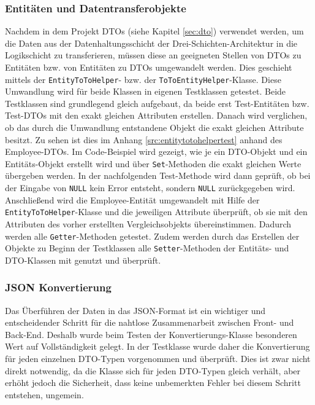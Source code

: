 \subsubsection{Entitäten und Datentransferobjekte}

Nachdem in dem Projekt \acsp{DTO} (siehe Kapitel \vref{sec:dto}) verwendet werden, um die Daten aus der Datenhaltungsschicht der Drei-Schichten-Architektur in die Logikschicht zu transferieren, müssen diese an geeigneten Stellen von \acsp{DTO} zu Entitäten bzw. von Entitäten zu \acsp{DTO}  umgewandelt werden.
Dies geschieht mittels der \texttt{EntityToToHelper}- bzw. der \texttt{ToToEntityHelper}-Klasse. Diese Umwandlung wird für beide Klassen in eigenen Testklassen getestet.
Beide Testklassen sind grundlegend gleich aufgebaut, da beide erst Test-Entitäten bzw. Test-\acsp{DTO} mit den exakt gleichen Attributen erstellen.
Danach wird verglichen, ob das durch die Umwandlung entstandene Objekt die exakt gleichen Attribute besitzt. Zu sehen ist dies im Anhang \vref{src:entitytotohelpertest} anhand des Employee-\acsp{DTO}.
Im Code-Beispiel wird gezeigt, wie je ein \acs{DTO}-Objekt und ein Entitäts-Objekt erstellt wird und über \texttt{Set}-Methoden die exakt gleichen Werte übergeben werden.
In der nachfolgenden Test-Methode wird dann geprüft, ob bei der Eingabe von \texttt{NULL} kein Error entsteht, sondern \texttt{NULL} zurückgegeben wird.
Anschließend wird die Employee-Entität umgewandelt mit Hilfe der \texttt{EntityToToHelper}-Klasse und die jeweiligen Attribute überprüft, ob sie mit den Attributen des vorher erstellten Vergleichsobjekts übereinstimmen.
Dadurch werden alle \texttt{Getter}-Methoden getestet. Zudem werden durch das Erstellen der Objekte zu Beginn der Testklassen alle \texttt{Setter}-Methoden der Entitäts- und \acs{DTO}-Klassen mit genutzt und überprüft.

\subsubsection{JSON Konvertierung}

Das Überführen der Daten in das \acs{JSON}-Format ist ein wichtiger und entscheidender Schritt für die nahtlose Zusammenarbeit zwischen Front- und Back-End.
Deshalb wurde beim Testen der Konvertierungs-Klasse besonderen Wert auf Vollständigkeit gelegt. In der Testklasse wurde daher die Konvertierung für jeden einzelnen \acs{DTO}-Typen vorgenommen und überprüft.
Dies ist zwar nicht direkt notwendig, da die Klasse sich für jeden \acs{DTO}-Typen gleich verhält, aber erhöht jedoch die Sicherheit, dass keine unbemerkten Fehler bei diesem Schritt entstehen, ungemein.


